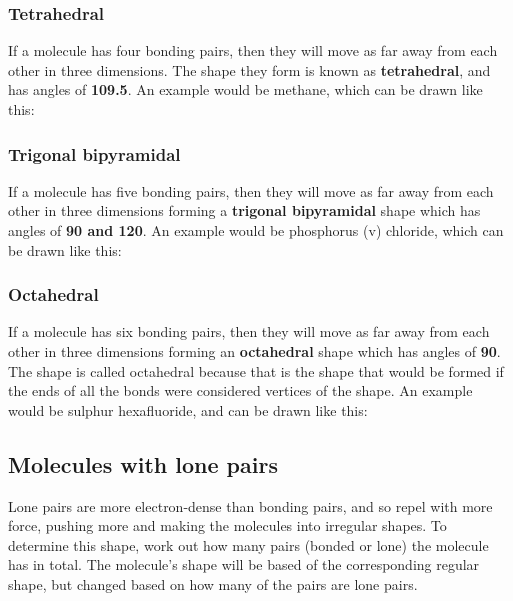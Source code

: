 \subsubsection{Tetrahedral}
If a molecule has four bonding pairs, then they will move as far away from each other in three dimensions. The shape they form is known as \textbf{tetrahedral}, and has angles of \textbf{109.5\textdegree}. An example would be methane, which can be drawn like this:
\begin{center}
\end{center}

\subsubsection{Trigonal bipyramidal}
If a molecule has five bonding pairs, then they will move as far away from each other in three dimensions forming a \textbf{trigonal bipyramidal} shape which has angles of \textbf{90\textdegree{} and 120\textdegree}. An example would be phosphorus (v) chloride, which can be drawn like this:

\begin{center}
\end{center}

\subsubsection{Octahedral}
If a molecule has six bonding pairs, then they will move as far away from each other in three dimensions forming an \textbf{octahedral} shape which has angles of \textbf{90\textdegree}. The shape is called octahedral because that is the shape that would be formed if the ends of all the bonds were considered vertices of the shape. An example would be sulphur hexafluoride, and can be drawn like this:
\begin{center}
\end{center}

\subsection{Molecules with lone pairs}
Lone pairs are more electron-dense than bonding pairs, and so repel with more force, pushing more and making the molecules into irregular shapes. To determine this shape, work out how many pairs (bonded or lone) the molecule has in total. The molecule's shape will be based of the corresponding regular shape, but changed based on how many of the pairs are lone pairs.

